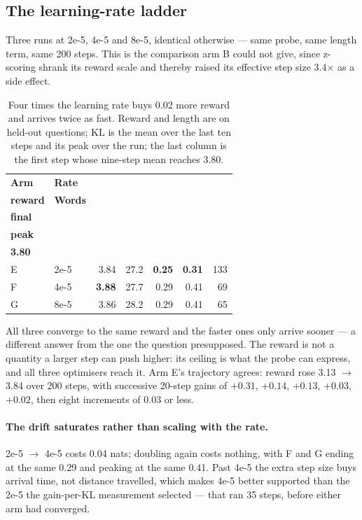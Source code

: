 \documentclass[11pt]{article}
\begin{document}
\subsection{The learning-rate ladder}

Three runs at 2e-5, 4e-5 and 8e-5, identical otherwise --- same probe, same length term, same 200 steps.
This is the comparison arm B could not give, since z-scoring shrank its reward scale and thereby raised
its effective step size 3.4$\times$ as a side effect.

\begin{table}[h]
\centering
\begin{tabular}{llrrrrr}
\toprule
\textbf{Arm} & \textbf{Rate} & \shortstack{\textbf{Held-out}\\\textbf{reward}} & \textbf{Words} & \shortstack{\textbf{KL,}\\\textbf{final}}
& \shortstack{\textbf{KL,}\\\textbf{peak}} & \shortstack{\textbf{Steps to}\\\textbf{3.80}} \\
\midrule
E & 2e-5 & 3.84 & 27.2 & \textbf{0.25} & \textbf{0.31} & 133 \\
F & 4e-5 & \textbf{3.88} & 27.7 & 0.29 & 0.41 & 69 \\
G & 8e-5 & 3.86 & 28.2 & 0.29 & 0.41 & 65 \\
\bottomrule
\end{tabular}
\caption{Four times the learning rate buys 0.02 more reward and arrives twice as fast. Reward and length
are on held-out questions; KL is the mean over the last ten steps and its peak over the run; the last
column is the first step whose nine-step mean reaches 3.80.}
\label{tab:ladder}
\end{table}

All three converge to the same reward and the faster ones only arrive sooner --- a different answer from
the one the question presupposed. The reward is not a quantity a larger step can push higher: its ceiling
is what the probe can express, and all three optimisers reach it. Arm E's trajectory agrees: reward rose
3.13 $\rightarrow$ 3.84 over 200 steps, with successive 20-step gains of $+0.31$, $+0.14$, $+0.13$,
$+0.03$, $+0.02$, then eight increments of 0.03 or less.

\paragraph{The drift saturates rather than scaling with the rate.} 2e-5 $\rightarrow$ 4e-5 costs 0.04
nats; doubling again costs nothing, with F and G ending at the same 0.29 and peaking at the same 0.41.
Past 4e-5 the extra step size buys arrival time, not distance travelled, which makes 4e-5 better
supported than the 2e-5 the gain-per-KL measurement selected --- that ran 35 steps, before either arm had
converged.
\end{document}
